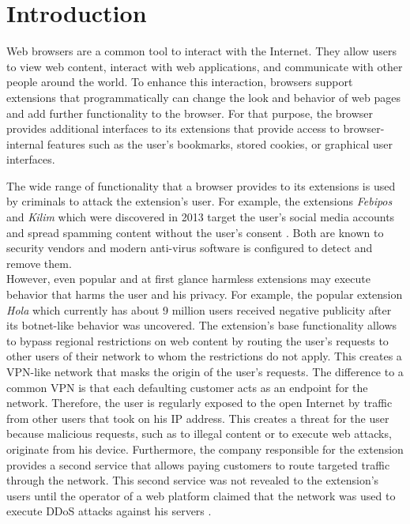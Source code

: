 
\chapter{Introduction}

	Web browsers are a common tool to interact with the Internet. They allow users to view web content, interact with web applications, and communicate with other people around the world. To enhance this interaction, browsers support extensions that programmatically can change the look and behavior of web pages and add further functionality to the browser. For that purpose, the browser provides additional interfaces to its extensions that provide access to browser-internal features such as the user's bookmarks, stored cookies, or graphical user interfaces.
	
	The wide range of functionality that a browser provides to its extensions is used by criminals to attack the extension's user. For example, the extensions \textit{Febipos} and \textit{Kilim} which were discovered in 2013 target the user's social media accounts and spread spamming content without the user's consent \cite{febipos, kilim}. Both are known to security vendors and modern anti-virus software is configured to detect and remove them. \\
	However, even popular and at first glance harmless extensions may execute behavior that harms the user and his privacy. For example, the popular extension \textit{Hola} which currently has about 9 million users received negative publicity after its botnet-like behavior was uncovered. The extension's base functionality allows to bypass regional restrictions on web content by routing the user's requests to other users of their network to whom the restrictions do not apply. This creates a VPN-like network that masks the origin of the user's requests. The difference to a common VPN is that each defaulting customer acts as an endpoint for the network. Therefore, the user is regularly exposed to the open Internet by traffic from other users that took on his IP address. This creates a threat for the user because malicious requests, such as to illegal content or to execute web attacks, originate from his device. Furthermore, the company responsible for the extension provides a second service that allows paying customers to route targeted traffic through the network. This second service was not revealed to the extension's users until the operator of a web platform claimed that the network was used to execute DDoS attacks against his servers \cite{holaFaqRewrite, 8chanHola}. 
	
